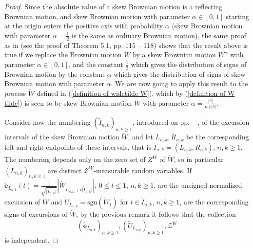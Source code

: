 \documentclass[reqno]{amsart}
\theoremstyle{definition}
\theoremstyle{remark}
\numberwithin{equation}{section}
\begin{document}
\begin{proof}
Since the absolute value of a skew Brownian motion is a reflecting Brownian motion, and skew Brownian motion with parameter $\alpha\in [0,1]$ starting at the origin enters the positive axis with probability $\alpha$ (skew Brownian motion with parameter $\alpha=\frac12$ is the same as ordinary Brownian motion), the same proof as in \cite{Blumenthal} (see the proof of Theorem 5.1, pp. 115 -- 118) shows that the result above is true if we replace the Brownian motion $W$ by a skew Brownian motion $W^{\alpha}$ with parameter $\alpha\in[0,1]$, and the constant $\frac12$ which gives the distribution of signs of Brownian motion by the constant $\alpha$ which gives the distribution of signs of skew Brownian motion with parameter $\alpha$. We are now going to apply this result to the process $\widetilde{W}$ defined in (\ref{definition of widetilde W}), which by (\ref{definition of W tilde}) is seen to be skew Brownian motion $\widetilde{W}$ with parameter $\alpha=\frac{\vert b \vert}{a+\vert b \vert}$.
\label{pagina de referinta end descompuere Ito-McKean}

Consider now the numbering $(\widetilde{I}_{n,k})_{n,k\ge 1}$, introduced on pp. \pageref{sign choice} -- \pageref{iid sign choice}, of the excursion intervals of the skew Brownian motion $\widetilde{W}$, and let $L_{n,k}, R_{n,k}$ be the corres\-ponding left and right endpoints of these intervals, that is $\widetilde{I}_{n,k}=(L_{n,k},R_{n.k})$, $n,k\ge 1$. The numbering depends only on the zero set of $Z^{\widetilde{W}}$ of $\widetilde{W}$, so in particular $(L_{n,k})_{n,k\ge 1}$ are distinct $\mathcal{Z}^{\widetilde{W}}$-measurable random variables. If $\widetilde{\textbf{e}}_{L_{n,k}}(t)=\frac{1}{\sqrt{\vert\widetilde{I}_{n,k}\vert}}\left\vert \widetilde{W}_{L_{n,k}+t\vert\widetilde{I}_{n,k}\vert}\right\vert$, $0\le t\le 1$, $n,k\ge 1$, are the unsigned normalized excursion of $\widetilde{W}$ and $\widetilde{U}_{L_{n,k}}=\mathrm{sgn}(\widetilde{W}_t)$ for $t\in\widetilde{I}_{n,k}$, $n,k\ge1$, are the corresponding signs of excursions of $\widetilde{W}$, by the previous remark it follows that the collection
\[
\left(\widetilde{\textbf{e}}_{L_{n,k}}\right)_{n,k\ge 1},\left( \widetilde{U}_{L_{n,k}}\right)_{n,k\ge 1},\mathcal{Z}^{\widetilde{W}}
\]
is independent.


\end{proof}
\end{document}
